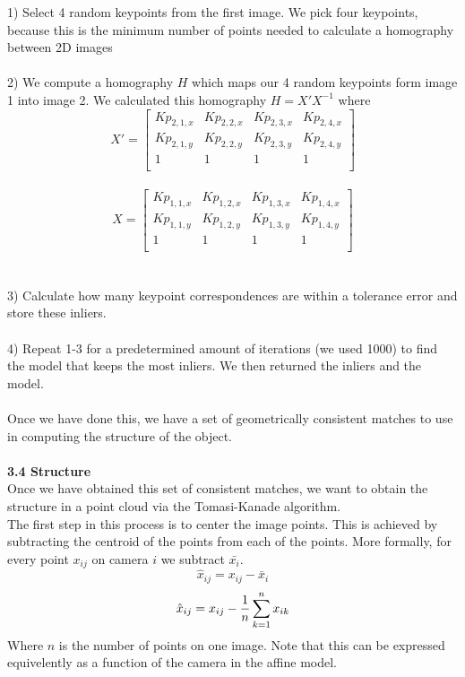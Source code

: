 \documentclass[12pt]{article}
\begin{document}
\begin{multicols}{2}
1) Select 4 random keypoints from the first image. We pick four keypoints, because this is the minimum number of points needed to calculate a homography between 2D images\\\\
2) We compute a homography $H$ which maps our 4 random keypoints form image 1 into image 2. We calculated this homography $H = X'X^{-1}$ where\\
$$X' = \left[\begin{array}{cccc}
 Kp_{2,1,x} & Kp_{2,2,x} & Kp_{2,3,x} & Kp_{2,4,x}\\ 
 Kp_{2,1,y} & Kp_{2,2,y} & Kp_{2,3,y} & Kp_{2,4,y}\\
 1 & 1 & 1 & 1\\
\end{array}\right]$$\\
$$X = \left[\begin{array}{cccc}
 Kp_{1,1,x} & Kp_{1,2,x} & Kp_{1,3,x} & Kp_{1,4,x}\\ 
 Kp_{1,1,y} & Kp_{1,2,y} & Kp_{1,3,y} & Kp_{1,4,y}\\
 1 & 1 & 1 & 1\\
\end{array}\right]$$\\\\
3) Calculate how many keypoint correspondences are within a tolerance error and store these inliers. \\\\
4) Repeat 1-3 for a predetermined amount of iterations (we used 1000) to find the model that keeps the most inliers. We then returned the inliers and the model.\\\\
Once we have done this, we have a set of geometrically consistent matches to use in computing the structure of the object.
\\\\
{\large \textbf{3.4 Structure}}\\
Once we have obtained this set of consistent matches, we want to obtain the structure in a point cloud via the Tomasi-Kanade algorithm. \\
\indent The first step in this process is to center the image points. This is achieved by subtracting the centroid of the points from each of the points. More formally, for every point $x_{ij}$ on camera $i$ we subtract $\bar{x_{i}}$. 
\[\hat{x}_{ij} = x_{ij} - \bar{x}_{i}\]
\[\hat{x}_{ij} = x_{ij} - {{1}\over{n}} \sum_{k=1}^{n} x_{ik}\]
Where $n$ is the number of points on one image. Note that this can be expressed equivelently as a function of the camera in the affine model. 

\end{multicols}
\end{document}
